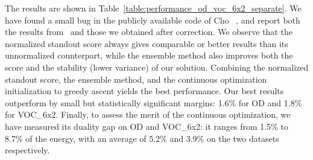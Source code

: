 \documentclass[10pt,twocolumn,letterpaper]{article}
\numberwithin{theorem}{section}
\begin{document}
\begin{table}
\centering
{}
\vspace{-2mm}
\caption{\small Performance of different configurations of our
  algorithm compared to the results of 
  Cho {\em et al.} on Object Discovery 
  and VOC\_6x2 datasets in the separate setting.}
\label{table:performance_od_voc_6x2_separate}
\vspace{-4mm}
\end{table}

The results are shown in
Table~\ref{table:performance_od_voc_6x2_separate}. We have found a small bug in the publicly available code
of Cho \etal~\cite{CKSP15}, and report both the results from~\cite{CKSP15} and those we
obtained after correction. We observe that the normalized
standout score always gives comparable or better results than its
unnormalized counterpart, while the ensemble method also improves both the
score and the stability (lower variance) of our solution. Combining the normalized standout score, the ensemble method, and the continuous optimization initialization to greedy ascent yields the best performance. 
Our best results outperform \cite{CKSP15} by small but statistically significant margins: 1.6\% for OD and  1.8\% for VOC\_6x2.
Finally, to assess the merit of the continuous optimization, we have measured its duality gap on OD and VOC\_6x2: it ranges from 1.5\% to 8.7\% of the energy, with an average of 5.2\% and 3.9\% on  the two datasets respectively.
\end{document}
